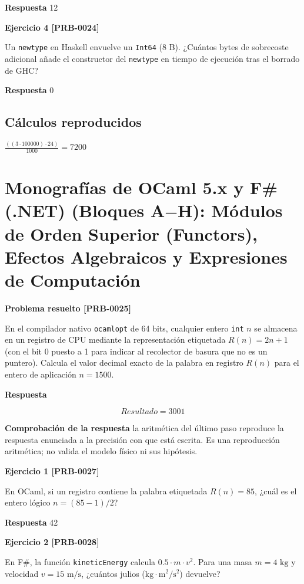 \documentclass{book}
\begin{document}
\noindent\textbf{Respuesta} 12

\noindent\textbf{Ejercicio 4 [PRB-0024]}

Un \texttt{newtype} en Haskell envuelve un \texttt{Int64} (8 B). ¿Cuántos bytes de sobrecoste adicional añade el constructor del \texttt{newtype} en tiempo de ejecución tras el borrado de GHC?

\noindent\textbf{Respuesta} 0

\subsection*{Cálculos reproducidos}

\(\frac{\left(\left(3\cdot 100000\right)\cdot 24\right)}{1000} = 7200\)

\section{Monografías de OCaml 5.x y F\# (.NET) (Bloques A\(-\)H): Módulos de Orden Superior (Functors), Efectos Algebraicos y Expresiones de Computación}

\noindent\textbf{Problema resuelto [PRB-0025]}

En el compilador nativo \texttt{ocamlopt} de 64 bits, cualquier entero \texttt{int} \(n\) se almacena en un registro de CPU mediante la representación etiquetada \(R(n) = 2n + 1\) (con el bit 0 puesto a 1 para indicar al recolector de basura que no es un puntero). Calcula el valor decimal exacto de la palabra en registro \(R(n)\) para el entero de aplicación \(n = 1500\).

\noindent\textbf{Respuesta}

\[
Resultado = 3001
\]

\noindent\textbf{Comprobación de la respuesta} la aritmética del último paso reproduce la respuesta enunciada a la precisión con que está escrita. Es una reproducción aritmética; no valida el modelo físico ni sus hipótesis.

\noindent\textbf{Ejercicio 1 [PRB-0027]}

En OCaml, si un registro contiene la palabra etiquetada \(R(n) = 85\), ¿cuál es el entero lógico \(n = (85 - 1) / 2\)?

\noindent\textbf{Respuesta} 42

\noindent\textbf{Ejercicio 2 [PRB-0028]}

En F\#, la función \texttt{kineticEnergy} calcula \(0.5 \cdot m \cdot v^2\). Para una masa \(m = 4\text{ kg}\) y velocidad \(v = 15\text{ m/s}\), ¿cuántos julios (\(\text{kg}\cdot\text{m}^2/\text{s}^2\)) devuelve?
\end{document}
